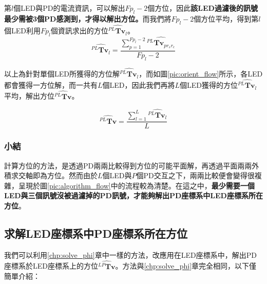 
        第$l$個LED與PD的電流資訊，可以解出$Fp_l-2$個方位，因此\textbf{該LED過濾後的訊號最少需被3個PD感測到，才得以解出方位。}而我們將$Fp_l-2$個方位平均，得到第$l$個LED利用$Fp_l$個資訊求出的方位$\hat{{^{PL}\boldsymbol{Tv}}_{l}}$。
        \begin{equation}
            \label{eqn:average_orient_led}
            \hat{{^{PL}\boldsymbol{Tv}}_{l}} = \frac{\sum^{Fp_l-2}_{p=1}\hat{{^{PL}\boldsymbol{Tv}}_{p{r_sr_c}}}}{Fp_l-2}
        \end{equation}

        \noindent 以上為針對單個LED所獲得的方位解$\hat{{^{PL}\boldsymbol{Tv}}_{l}}$，而如圖\ref{pic:orient_flow}所示，各LED都會獲得一方位解，而一共有$L$個LED，因此我們再將$L$個LED獲得的方位$\hat{{^{PL}\boldsymbol{Tv}}_{l}}$平均，解出方位$\hat{{^{PL}\boldsymbol{Tv}}}$。

        \begin{equation}
            \label{eqn:average_orient}
            \hat{{^{PL}\boldsymbol{Tv}}} = \frac{\sum^{L}_{l=1}\hat{{^{PL}\boldsymbol{Tv}}_{l}}}{L}
        \end{equation}
        
        
    \subsubsection{小結}
    \label{chp:orient_conclu}

    計算方位的方法，是透過PD兩兩比較得到方位的可能平面解，再透過平面兩兩外積求交軸即為方位。然而由於$L$個LED與$P$個PD交互之下，兩兩比較便會變得很複雜，呈現於圖\ref{pic:algorithm_flow}中的流程較為清楚。在這之中，\textbf{最少需要一個LED與三個訊號沒被過濾掉的PD訊號，才能夠解出PD座標系中LED座標系所在方位}。

        
    \subsection{求解LED座標系中PD座標系所在方位}
    \label{chp:solve_theta}

    我們可以利用\ref{chp:solve_phi}章中一樣的方法，改應用在LED座標系中，解出PD座標系於LED座標系上的方位$\hat{{^{LP}\boldsymbol{Tv}}}$。方法與\ref{chp:solve_phi}章完全相同，以下僅簡單介紹：

